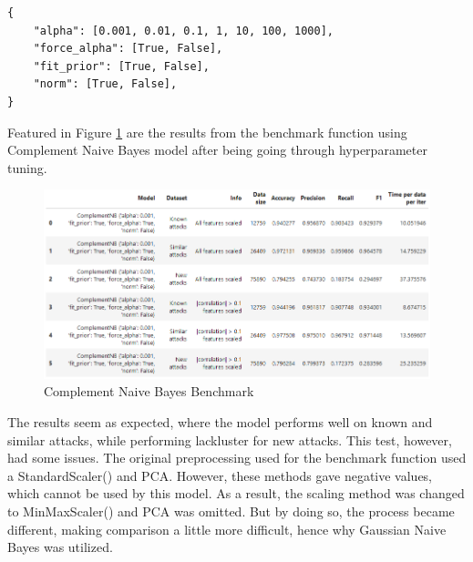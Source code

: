 \begin{lstlisting}
{
    "alpha": [0.001, 0.01, 0.1, 1, 10, 100, 1000],
    "force_alpha": [True, False],
    "fit_prior": [True, False],
    "norm": [True, False],
}
\end{lstlisting}

Featured in Figure \ref{fig:comp_nb_bench} are the results from the benchmark function using Complement Naive Bayes model after being going through hyperparameter tuning.

\begin{figure}[!htb]
    \centering
    \includegraphics[width=\linewidth]{figures//naive_bayes/comp_nb_bench.png}
    \caption{Complement Naive Bayes Benchmark}%
    \label{fig:comp_nb_bench}
\end{figure}

The results seem as expected, where the model performs well on known and similar attacks, while performing lackluster for new attacks. This test, however, had some issues. The original preprocessing used for the benchmark function used a StandardScaler() and PCA. However, these methods gave negative values, which cannot be used by this model. As a result, the scaling method was changed to MinMaxScaler() and PCA was omitted. But by doing so, the process became different, making comparison a little more difficult, hence why Gaussian Naive Bayes was utilized.


